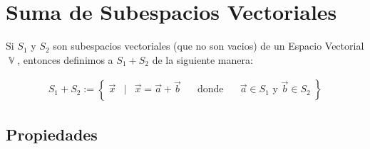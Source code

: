 \documentclass[12pt, fleqn]{report}                             %
\DeclareMathOperator \Space     {\quad}                         %
\DeclareMathOperator \MiniSpace {\;}                            %
\newcommand \Such           {\MiniSpace | \MiniSpace}           %
\theoremstyle{break}                                            %
\DeclareMathOperator \VectorSet    {\mathbb{V}}                 %
\newcommand{\Set}[1]            {\left\{ \; #1 \; \right\}}     %
\begin{document}
        \clearpage
        \section{Suma de Subespacios Vectoriales}

            Si $S_1$ y $S_2$ son subespacios vectoriales (que no son vacios) de un Espacio Vectorial
            $\VectorSet$, entonces definimos a $S_1 + S_2$ de la siguiente manera:

            \begin{align}
                S_1 + S_2 := \Set{
                    \vec x 
                        \Such \vec x = \vec{a} + \vec{b} 
                        \Space \text{donde} \Space
                        \vec{a} \in S_1 \text{ y }
                        \vec{b} \in S_2
                    }
            \end{align}


            \vspace{1em}
            \subsection{Propiedades}
\end{document}

